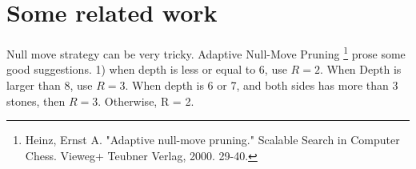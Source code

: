 \documentclass{article}
\begin{document}
\clearpage
\section{Some related work}

Null move strategy can be very tricky. Adaptive Null-Move Pruning \footnote{Heinz, Ernst A. "Adaptive null-move pruning." Scalable Search in Computer Chess. Vieweg+ Teubner Verlag, 2000. 29-40.} prose some good suggestions. 1) when depth is less or equal to 6, use $R=2$. When Depth is larger than 8, use $R=3$. When depth is 6 or 7, and both sides has more than 3 stones, then $R = 3$. Otherwise, R = 2.
\end{document}
